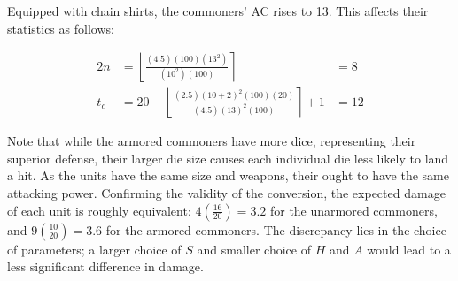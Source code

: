 Equipped with chain shirts, the commoners' AC rises to 13.
This affects their statistics as follows:

\begin{alignat*}{2}
    n   &=
        \left\lfloor
            \frac
                {(4.5) (100) (13^2)}
                {(10^2) (100)}
        \right\rceil
            &= 8
    \\
    t_c &=
        20 -
        \left\lfloor
            \frac
                {(2.5) (10 + 2)^2 (100) (20)}
                {(4.5) (13)^2 (100)}
        \right\rceil
        + 1
            &= 12
\end{alignat*}

Note that while the armored commoners have more dice,
representing their superior defense,
their larger die size causes each individual die less likely to land a hit.
As the units have the same size and weapons,
their ought to have the same attacking power.
Confirming the validity of the conversion,
the expected damage of each unit is roughly equivalent:
$4(\frac{16}{20}) = 3.2$ for the unarmored commoners,
and $9(\frac{10}{20}) = 3.6$ for the armored commoners.
The discrepancy lies in the choice of parameters;
a larger choice of $S$ and smaller choice of $H$ and $A$
would lead to a less significant difference in damage.
